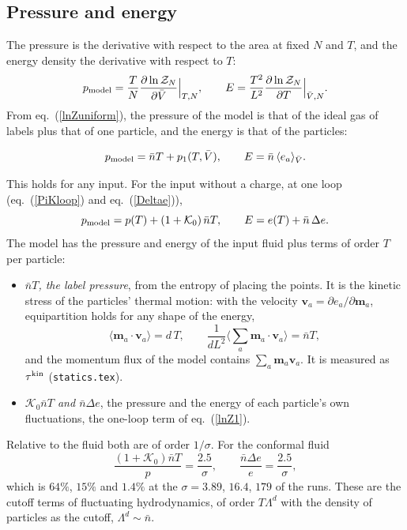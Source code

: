 \documentclass[11pt,aps,preprint,nofootinbib,superscriptaddress,tightenlines]{revtex4-2}
\newcommand{\avg}[1]{\langle #1\rangle}
\def\st{\begin{equation}}
\def\stp{\end{equation}}
\def\Eq#1{eq.~(\ref{#1})}
\begin{document}
\subsection{Pressure and energy}
\label{sec:pe}

The pressure is the derivative with respect to the area at fixed $N$ and $T$, and the energy density the derivative with respect to $T$:
\st
p_{\rm model}=\frac{T}{N}\frac{\partial\ln\mathcal Z_N}{\partial\bar V}\Big|_{T,N},\qquad E=\frac{T^2}{L^2}\frac{\partial\ln\mathcal Z_N}{\partial T}\Big|_{\bar V,N} .
\stp
From \Eq{lnZuniform}, the pressure of the model is that of the ideal gas of labels plus that of one particle, and the energy is that of the particles:
\begin{keyeq}
\st
p_{\rm model}=\bar nT+p_1(T,\bar V),\qquad E=\bar n\,\avg{e_a}_{\bar V} .
\label{pE}
\stp
\end{keyeq}
This holds for any input.  For the input without a charge, at one loop (\Eq{PiKloop} and \Eq{Deltae}),
\st
p_{\rm model}=p(T)+(1+\mathcal K_0)\,\bar nT,\qquad E=e(T)+\bar n\,\Delta e .
\label{pEloop}
\stp
The model has the pressure and energy of the input fluid plus terms of order $T$ per particle:

\begin{itemize}
\item \emph{$\bar nT$, the label pressure}, from the entropy of placing the points.  It is the kinetic stress of the particles' thermal motion: with the velocity
  $\bm v_a=\partial e_a/\partial\bm m_a$, equipartition holds for any shape of the energy,
  \st
  \avg{\bm m_a\cdot\bm v_a}=d\,T,\qquad \frac1{dL^2}\Big\langle\sum_a\bm m_a\cdot\bm v_a\Big\rangle=\bar nT ,
  \stp
  and the momentum flux of the model contains $\sum_a\bm m_a\bm v_a$.  It is measured as $\tau^{\rm kin}$ (\texttt{statics.tex}).
\item \emph{$\mathcal K_0\bar nT$ and $\bar n\Delta e$}, the pressure and the energy of each particle's own fluctuations, the one-loop term of \Eq{lnZ1}.
\end{itemize}

Relative to the fluid both are of order $1/\sigma$.  For the conformal fluid
\st
\frac{(1+\mathcal K_0)\bar nT}{p}=\frac{2.5}\sigma,\qquad \frac{\bar n\Delta e}{e}=\frac{2.5}\sigma ,
\stp
which is $64\%$, $15\%$ and $1.4\%$ at the $\sigma=3.89$, $16.4$, $179$ of the runs.  These are the cutoff terms of fluctuating hydrodynamics, of
order $T\Lambda^d$ with the density of particles as the cutoff, $\Lambda^d\sim\bar n$.
\end{document}
